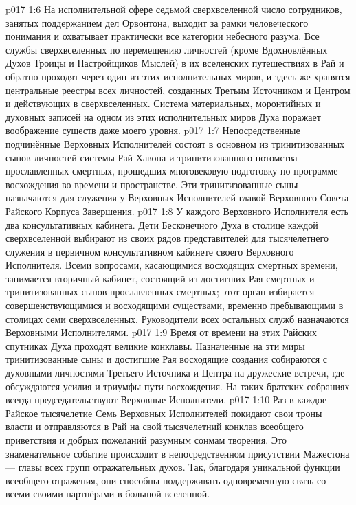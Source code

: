 \vs p017 1:6 На исполнительной сфере седьмой сверхвселенной число сотрудников, занятых поддержанием дел Орвонтона, выходит за рамки человеческого понимания и охватывает практически все категории небесного разума. Все службы сверхвселенных по перемещению личностей (кроме Вдохновлённых Духов Троицы и Настройщиков Мыслей) в их вселенских путешествиях в Рай и обратно проходят через один из этих исполнительных миров, и здесь же хранятся центральные реестры всех личностей, созданных Третьим Источником и Центром и действующих в сверхвселенных. Система материальных, моронтийных и духовных записей на одном из этих исполнительных миров Духа поражает воображение существ даже моего уровня.
\vs p017 1:7 Непосредственные подчинённые Верховных Исполнителей состоят в основном из тринитизованных сынов личностей системы Рай\hyp{}Хавона и тринитизованного потомства прославленных смертных, прошедших многовековую подготовку по программе восхождения во времени и пространстве. Эти тринитизованные сыны назначаются для служения у Верховных Исполнителей главой Верховного Совета Райского Корпуса Завершения.
\vs p017 1:8 У каждого Верховного Исполнителя есть два консультативных кабинета. Дети Бесконечного Духа в столице каждой сверхвселенной выбирают из своих рядов представителей для тысячелетнего служения в первичном консультативном кабинете своего Верховного Исполнителя. Всеми вопросами, касающимися восходящих смертных времени, занимается вторичный кабинет, состоящий из достигших Рая смертных и тринитизованных сынов прославленных смертных; этот орган избирается совершенствующимися и восходящими существами, временно пребывающими в столицах семи сверхвселенных. Руководители всех остальных служб назначаются Верховными Исполнителями.
\vs p017 1:9 \pc Время от времени на этих Райских спутниках Духа проходят великие конклавы. Назначенные на эти миры тринитизованные сыны и достигшие Рая восходящие создания собираются с духовными личностями Третьего Источника и Центра на дружеские встречи, где обсуждаются усилия и триумфы пути восхождения. На таких братских собраниях всегда председательствуют Верховные Исполнители.
\vs p017 1:10 Раз в каждое Райское тысячелетие Семь Верховных Исполнителей покидают свои троны власти и отправляются в Рай на свой тысячелетний конклав всеобщего приветствия и добрых пожеланий разумным сонмам творения. Это знаменательное событие происходит в непосредственном присутствии Мажестона --- главы всех групп отражательных духов. Так, благодаря уникальной функции всеобщего отражения, они способны поддерживать одновременную связь со всеми своими партнёрами в большой вселенной.
